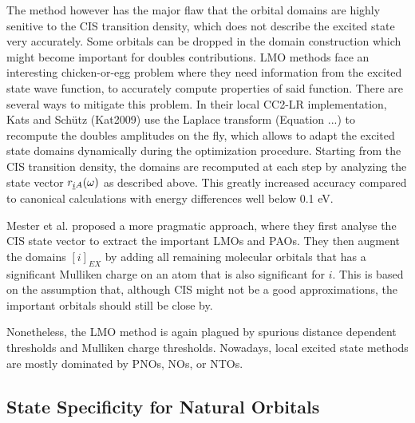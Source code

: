 The method however has the major flaw that the orbital domains are highly senitive to the CIS transition density, which does not describe the excited state very accurately. Some orbitals can be dropped in the domain construction which might become important for doubles contributions. LMO methods face an interesting chicken-or-egg problem where they need information from the excited state wave function, to accurately compute properties of said function. There are several ways to mitigate this problem. In their local CC2-LR implementation, Kats and Schütz (Kat2009) use the Laplace transform (Equation ...) to recompute the doubles amplitudes on the fly, which allows to adapt the excited state domains dynamically during the optimization procedure. Starting from the CIS transition density, the domains are recomputed at each step by analyzing the state vector $r_{\underline{i} A}(\omega)$ as described above. This greatly increased accuracy compared to canonical calculations with energy differences well below 0.1 eV.

Mester et al. proposed a more pragmatic approach, where they first analyse the CIS state vector to extract the important LMOs and PAOs. They then augment the domains $[i]_{EX}$ by adding all remaining molecular orbitals that has a significant Mulliken charge on an atom that is also significant for $i$. This is based on the assumption that, although CIS might not be a good approximations, the important orbitals should still be close by. 

Nonetheless, the LMO method is again plagued by spurious distance dependent thresholds and Mulliken charge thresholds. Nowadays, local excited state methods are mostly dominated by PNOs, NOs, or NTOs. 


\subsection{State Specificity for Natural Orbitals}

